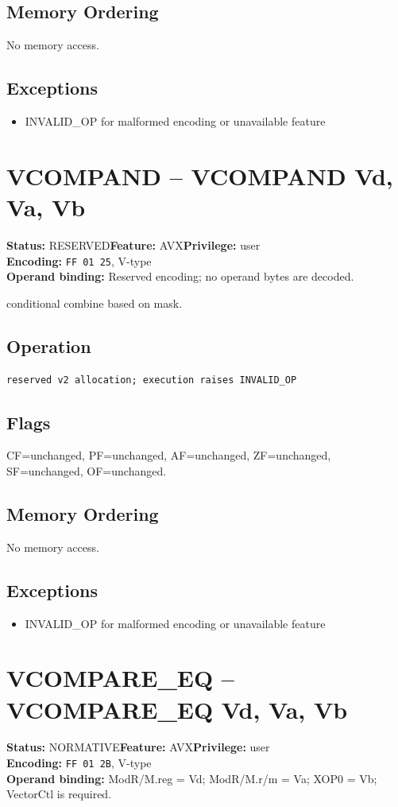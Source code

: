 \documentclass[10pt]{article}
\begin{document}
\subsection*{Memory Ordering}
No memory access.
\subsection*{Exceptions}
\begin{itemize}
\item INVALID\_OP for malformed encoding or unavailable feature
\end{itemize}
\clearpage

\section{VCOMPAND -- VCOMPAND Vd, Va, Vb}
\textbf{Status:} RESERVED\quad \textbf{Feature:} AVX\quad \textbf{Privilege:} user\\
\textbf{Encoding:} \texttt{FF 01 25}, V-type\\
\textbf{Operand binding:} Reserved encoding; no operand bytes are decoded.

conditional combine based on mask.

\subsection*{Operation}
\begin{lstlisting}
reserved v2 allocation; execution raises INVALID_OP
\end{lstlisting}
\subsection*{Flags}
CF=unchanged, PF=unchanged, AF=unchanged, ZF=unchanged, SF=unchanged, OF=unchanged.
\subsection*{Memory Ordering}
No memory access.
\subsection*{Exceptions}
\begin{itemize}
\item INVALID\_OP for malformed encoding or unavailable feature
\end{itemize}
\clearpage

\section{VCOMPARE\_EQ -- VCOMPARE\_EQ Vd, Va, Vb}
\textbf{Status:} NORMATIVE\quad \textbf{Feature:} AVX\quad \textbf{Privilege:} user\\
\textbf{Encoding:} \texttt{FF 01 2B}, V-type\\
\textbf{Operand binding:} ModR/M.reg = Vd; ModR/M.r/m = Va; XOP0 = Vb; VectorCtl is required.
\end{document}
